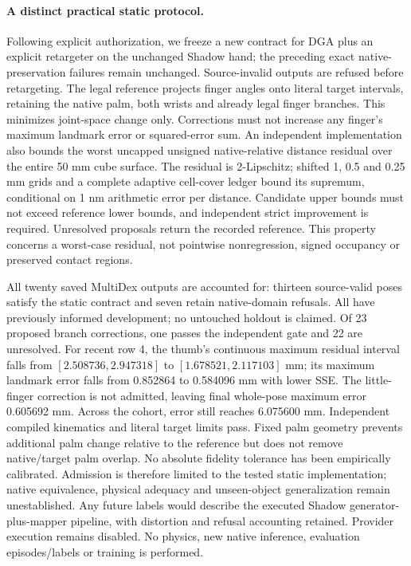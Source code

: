 \documentclass[10pt,letterpaper]{article}
\begin{document}
\paragraph{A distinct practical static protocol.}
Following explicit authorization, we freeze a new contract for DGA plus an
explicit retargeter on the unchanged Shadow hand; the preceding exact
native-preservation failures remain unchanged. Source-invalid outputs are
refused before retargeting. The legal reference projects finger angles onto
literal target intervals, retaining the native palm, both wrists and already
legal finger branches. This minimizes joint-space change only. Corrections
must not increase any finger's maximum landmark error or squared-error sum.
An independent implementation also bounds the worst uncapped unsigned
native-relative distance residual over the entire 50 mm cube surface.
The residual is 2-Lipschitz; shifted 1, 0.5 and 0.25 mm grids and a complete
adaptive cell-cover ledger bound its supremum, conditional on 1 nm arithmetic
error per distance. Candidate upper bounds must not exceed reference lower
bounds, and independent strict improvement is required. Unresolved proposals
return the recorded reference. This property concerns a worst-case residual,
not pointwise nonregression, signed occupancy or preserved contact regions.

All twenty saved MultiDex outputs are accounted for: thirteen source-valid
poses satisfy the static contract and seven retain native-domain refusals.
All have previously informed development; no untouched holdout is claimed.
Of 23 proposed branch corrections, one passes the independent gate and 22
are unresolved. For recent row 4, the thumb's continuous maximum residual
interval falls from $[2.508736,2.947318]$ to $[1.678521,2.117103]$ mm;
its maximum landmark error falls from 0.852864 to 0.584096 mm with lower SSE.
The little-finger correction is not admitted, leaving final whole-pose maximum
error 0.605692 mm. Across the cohort, error still reaches 6.075600 mm.
Independent compiled kinematics and literal target limits pass. Fixed palm
geometry prevents additional palm change relative to the reference but does
not remove native/target palm overlap. No absolute fidelity tolerance has been
empirically calibrated. Admission is therefore limited to the tested static
implementation; native equivalence, physical adequacy and unseen-object
generalization remain unestablished. Any future labels would describe the
executed Shadow generator-plus-mapper pipeline, with distortion and refusal
accounting retained. Provider execution remains disabled. No physics, new
native inference, evaluation episodes/labels or training is performed.
\end{document}
